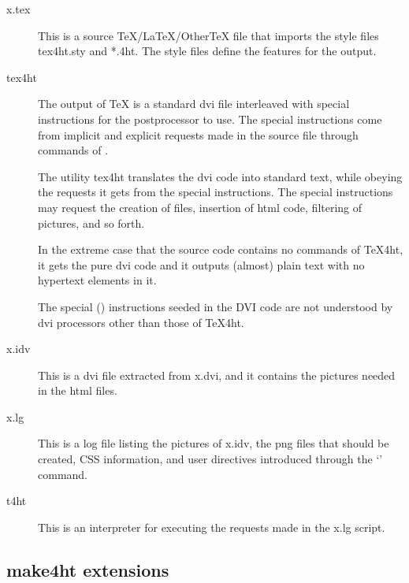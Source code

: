 \begin{description}
  \item[x.tex]

This is a source TeX/LaTeX/OtherTeX file that imports the style files tex4ht.sty and *.4ht. The style files define the features for the output.

\item[tex4ht]

The output of \TeX{} is a standard dvi file interleaved with special
instructions for the postprocessor  to use. The special
instructions come from implicit and explicit requests made in the source file
through commands of \texfourht.

The utility tex4ht translates the dvi code into standard text, while obeying
the requests it gets from the special instructions. The special instructions
may request the creation of files, insertion of html code, filtering of
pictures, and so forth.

In the extreme case that the source code contains no commands of \TeX4ht, it
gets the pure dvi code and it outputs (almost) plain text with no hypertext
elements in it.

The special (\texcommand{\special}) instructions seeded in the DVI code are not understood
by dvi processors other than those of \TeX4ht.

\item[x.idv]

This is a dvi file extracted from x.dvi, and it contains the pictures needed in
the html files.

\item[x.lg]

This is a log file listing the pictures of x.idv, the png files that should be
created, CSS information, and user directives introduced through the
‘’ command.

\item[t4ht]
This is an interpreter for executing the requests made in the x.lg script.

\end{description}

\subsection{make4ht extensions}\label{sec:make4ht-extensions}
